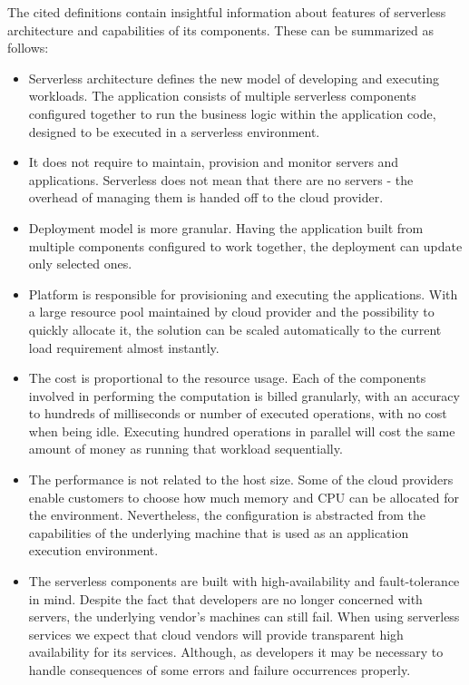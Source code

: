 The cited definitions contain insightful information about features of serverless architecture and capabilities of its components. These can be summarized as follows:

\begin{itemize}
    \item Serverless architecture defines the new model of developing and executing workloads. The application consists of multiple serverless components configured together to run the business logic within the application code, designed to be executed in a serverless environment.
    \item It does not require to maintain, provision and monitor servers and applications. Serverless does not mean that there are no servers - the overhead of managing them is handed off to the cloud provider.
    \item Deployment model is more granular. Having the application built from multiple components configured to work together, the deployment can update only selected ones.
    \item Platform is responsible for provisioning and executing the applications. With a large resource pool maintained by cloud provider and the possibility to quickly allocate it, the solution can be scaled automatically to the current load requirement almost instantly.
    \item The cost is proportional to the resource usage. Each of the components involved in performing the computation is billed granularly, with an accuracy to hundreds of milliseconds or number of executed operations, with no cost when being idle. Executing hundred operations in parallel will cost the same amount of money as running that workload sequentially.
    \item The performance is not related to the host size. Some of the cloud providers enable customers to choose how much memory and CPU can be allocated for the environment. Nevertheless, the configuration is abstracted from the capabilities of the underlying machine that is used as an application execution environment.
    \item The serverless components are built with high-availability and fault-tolerance in mind. Despite the fact that developers are no longer concerned with servers, the underlying vendor's machines can still fail. When using serverless services we expect that cloud vendors will provide transparent high availability for its services. Although, as developers it may be necessary to handle consequences of some errors and failure occurrences properly.
\end{itemize}

